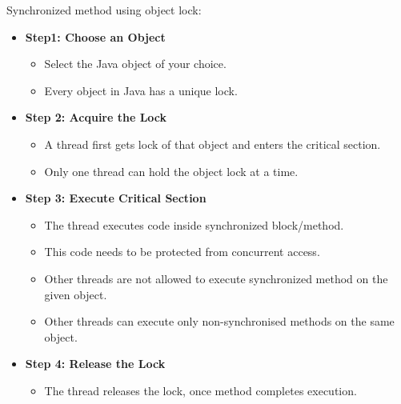 \setlength{\columnsep}{3pt}
\begin{flushleft}
	Synchronized method using object lock:
	\begin{itemize}
		\item \textbf{Step1: Choose an Object}
		\begin{itemize}
			\item Select the Java object of your choice.
			\item Every object in Java has a unique lock. 
		\end{itemize}
		\item \textbf{Step 2: Acquire the Lock}
		\begin{itemize}
			\item A thread first gets lock of that object and enters the critical section.
			\item Only one thread can hold the object lock at a time.
		\end{itemize}
		\item \textbf{Step 3: Execute Critical Section}
		\begin{itemize}
			\item The thread executes code inside synchronized block/method.
			\item This code needs to be protected from concurrent access.
			\item Other threads are not allowed to execute synchronized method on the given object. 
			\item Other threads can execute only non-synchronised methods on the same object.
		\end{itemize}
		\item \textbf{Step 4: Release the Lock}
		\begin{itemize}
			\item The thread releases the lock, once method completes execution.
		\end{itemize}
	\end{itemize}


\end{flushleft}
